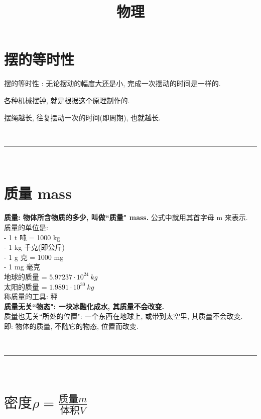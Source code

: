 \documentclass[UTF8]{ctexart}
\title{物理}
\begin{document}
	\tableofcontents %
	\date{} %
	\maketitle  %
	
	
	\section{摆的等时性}
	
	摆的等时性 : 无论摆动的幅度大还是小, 完成一次摆动的时间是一样的.	
	
	各种机械摆钟, 就是根据这个原理制作的.
	
	摆绳越长, 往复摆动一次的时间(即周期), 也就越长.
	
	
~\\
\hrule
~\\
	
	
	
	\section{质量 mass}
	
	\textbf{质量: 物体所含物质的多少, 叫做``质量" mass.} 公式中就用其首字母 m 来表示. \\
	
	质量的单位是:	 \\
	- 1 t 吨 = 1000 kg \\
	- 1 kg 千克(即公斤) \\
	- 1 g 克 = 1000 mg \\
	- 1 mg 毫克 \\
	
	地球的质量 = $ 5.97237 \cdot 10^{24} \ kg $ \\
	太阳的质量 = $ 1.9891 \cdot 10^{30} \ kg $ \\
	
	称质量的工具: 秤  \\
	
	\textbf{质量无关``物态": 一块冰融化成水, 其质量不会改变.} \\	
	质量也无关``所处的位置": 一个东西在地球上, 或带到太空里, 其质量不会改变. \\
	即: 物体的质量, 不随它的物态, 位置而改变. 
	
	
	~\\
	\hrule
	~\\
	
	
	\section{$\text{密度}\rho =\frac{\text{质量}m}{\text{体积}V}$}
	
\end{document}
